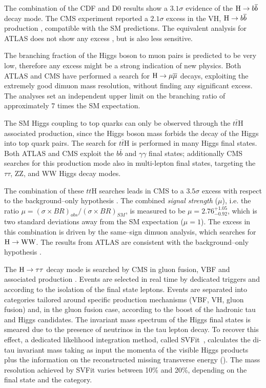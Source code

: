 The combination of the CDF and D0 results \cite{Aaltonen:2012qt} show a $3.1\sigma$ evidence of the $\mathrm{H} \rightarrow b \overline{b}$ decay mode. The CMS experiment reported a $2.1\sigma$ excess in the VH, $\mathrm{H} \rightarrow b \overline{b}$ production \cite{Chatrchyan:2013zna}, compatible with the SM predictions. The equivalent analysis for ATLAS does not show any excess \cite{TheATLAScollaboration:2013lia}, but is also less sensitive.

The branching fraction of the Higgs boson to muon pairs is predicted to be very low, therefore any excess might be a strong indication of new physics. Both ATLAS \cite{Aad:2014xva} and CMS \cite{CMS:2013aga} have performed a search for  $\mathrm{H} \rightarrow \mu \overline{\mu}$ decays, exploiting the extremely good dimuon mass resolution, without finding any significant excess. The analyses set an independent upper limit on the branching ratio of approximately 7 times the SM expectation.

The SM Higgs coupling to top quarks can only be observed through the $t\bar{t}$H associated production, since the Higgs boson mass forbids the decay of the Higgs into top quark pairs. The search for $t\bar{t}$H \cite{ATLASCONF:2014043,CMS:2014ega} is performed in many Higgs final states. Both ATLAS and CMS exploit the $b\bar{b}$ and $\gamma\gamma$ final states; additionally CMS searches for this production mode also in multi-lepton final states, targeting the $\tau\tau$, ZZ, and WW Higgs decay modes.

The combination of these $tt$H searches leads in CMS to a $3.5\sigma$ excess with respect to the background--only hypothesis \cite{CMS:2014ega}. The combined \emph{signal strength} ($\mu$), i.e. the ratio $\mu = (\sigma \times BR)_{obs} / (\sigma \times BR)_{SM}$, is measured to be $\mu = 2.76^{+1.05}_{-0.92}$, which is two standard deviations away from the SM expectation ($\mu = 1$). The excess in this combination is driven by the same--sign dimuon analysis, which searches for $\mathrm{H}\rightarrow \mathrm{W}\mathrm{W}$. The results from ATLAS are consistent with the background--only hypothesis \cite{ATLASCONF:2014043}.

The $\mathrm{H} \to \tau \tau$ decay mode is searched by CMS in gluon fusion, VBF and associated production \cite{H_tautau}. Events are selected in real time by dedicated triggers and according to the isolation of the final state leptons. Events are separated into categories tailored around specific production mechanisms (VBF, VH, gluon fusion) and, in the gluon fusion case, according to the boost of the hadronic tau and Higgs candidates. The invariant mass spectrum of the Higgs final states is smeared due to the presence of neutrinos in the tau lepton decay. To recover this effect, a dedicated likelihood integration method, called SVFit~\cite{}, calculates the di-tau invariant mass taking as input the momenta of the visible Higgs products plus the information on the reconstructed missing transverse energy (\MET). The mass resolution achieved by SVFit varies between 10\% and 20\%, depending on the final state and the category.

